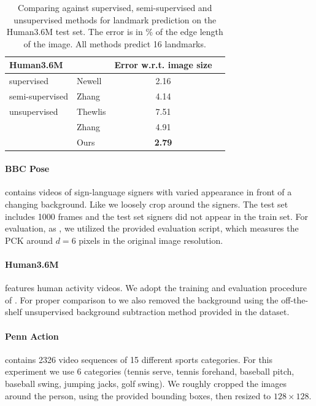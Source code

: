 		\begin{table}[t]
			\caption{{Comparing against supervised, semi-supervised and unsupervised methods for landmark prediction on the Human3.6M test set. The
			error is in \% of the edge length of the image. All methods predict 16 landmarks.
			}}
			\label{tab:human}
			\centering
			\begin{tabular}{ll|cr}
			\hline
			 Human3.6M   & &  { Error w.r.t. image size}  \\
			 \hline
			 supervised & Newell \cite{newell16hourglass}
			  &2.16  \\  \hline
			 semi-supervised & Zhang \cite{zhang18}
			  & 4.14  \\ \hline
			 unsupervised & Thewlis \cite{thewlis17}
			 & 7.51  \\
			  & Zhang \cite{zhang18}
				& 4.91 \\
			  & Ours& \textbf{2.79} \\
			\hline
			\end{tabular}
		\end{table}


		\paragraph{BBC Pose} \cite{charles13bbcpose} contains videos of sign-language signers with varied appearance in front of a changing background. Like \cite{jakab18} we loosely crop around the signers.
		The test set includes 1000 frames and the test set signers did not appear in the train set.
		For evaluation, as \cite{jakab18}, we utilized the provided evaluation script, which measures the PCK around $d=6$ pixels in the original image resolution.


		\paragraph{Human3.6M} \cite{ionescu14human36m} features human activity videos.
		We adopt the training and evaluation procedure of \cite{zhang18}.
		For proper comparison to \cite{zhang18} we also removed the background using the off-the-shelf unsupervised background subtraction method provided in the dataset.


		\paragraph{Penn Action} \cite{zhang13penn} contains 2326 video sequences of 15 different sports categories.
		For this experiment we use 6 categories (tennis serve, tennis forehand, baseball pitch, baseball swing, jumping jacks, golf swing).
		We roughly cropped the images around the person, using the provided bounding boxes, then resized to $128\times128$.

